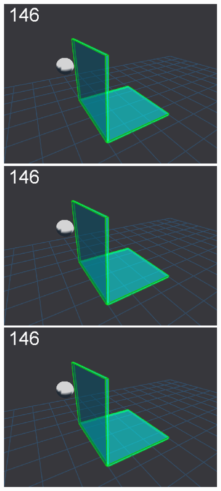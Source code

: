 \newlength{\imgBXwid}
\setlength{\imgBXwid}{2.15cm}
\begin{figure}[tb]
\centerline{
\includegraphics[width=\imgBXwid]{images/B1_1exp_20_1}
\includegraphics[width=\imgBXwid]{images/B1_2exp_20_1}
\includegraphics[width=\imgBXwid]{images/B1_3exp_20_1}
}
\end{figure}
